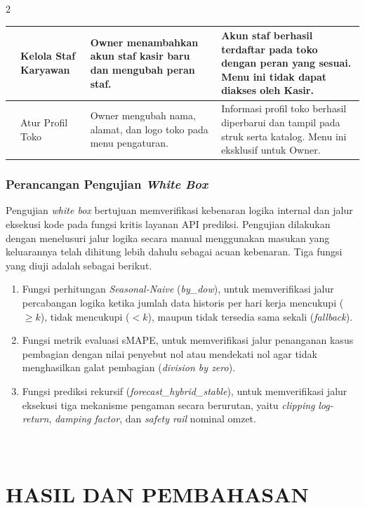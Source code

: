 \documentclass[12pt, a4paper, onecolumn, oneside]{report}
\begin{document}
\begin{spacing}{2}
{\begin{longtable}{|>{\centering\arraybackslash}p{0.6cm}|>{\raggedright\arraybackslash}p{3.0cm}|>{\raggedright\arraybackslash}p{4.7cm}|>{\raggedright\arraybackslash}p{4.7cm}|}
\hline
11 & Kelola Staf Karyawan & Owner menambahkan akun staf kasir baru dan mengubah peran staf. & Akun staf berhasil terdaftar pada toko dengan peran yang sesuai. Menu ini tidak dapat diakses oleh Kasir. \\
\hline
12 & Atur Profil Toko & Owner mengubah nama, alamat, dan logo toko pada menu pengaturan. & Informasi profil toko berhasil diperbarui dan tampil pada struk serta katalog. Menu ini eksklusif untuk Owner. \\
\hline
\end{longtable}
}

\subsection{Perancangan Pengujian \textit{White Box}}

Pengujian \textit{white box} bertujuan memverifikasi kebenaran logika internal dan jalur eksekusi kode pada fungsi kritis layanan API prediksi. Pengujian dilakukan dengan menelusuri jalur logika secara manual menggunakan masukan yang keluarannya telah dihitung lebih dahulu sebagai acuan kebenaran. Tiga fungsi yang diuji adalah sebagai berikut.
\begin{enumerate}
    \item Fungsi perhitungan \textit{Seasonal-Naive} (\textit{by\_dow}), untuk memverifikasi jalur percabangan logika ketika jumlah data historis per hari kerja mencukupi ($\geq k$), tidak mencukupi ($<k$), maupun tidak tersedia sama sekali (\textit{fallback}).
    \item Fungsi metrik evaluasi sMAPE, untuk memverifikasi jalur penanganan kasus pembagian dengan nilai penyebut nol atau mendekati nol agar tidak menghasilkan galat pembagian (\textit{division by zero}).
    \item Fungsi prediksi rekursif (\textit{forecast\_hybrid\_stable}), untuk memverifikasi jalur eksekusi tiga mekanisme pengaman secara berurutan, yaitu \textit{clipping} \textit{log-return}, \textit{damping factor}, dan \textit{safety rail} nominal omzet.
\end{enumerate}

\chapter[HASIL DAN PEMBAHASAN]{\\ HASIL DAN PEMBAHASAN}


\end{spacing}
\end{document}
